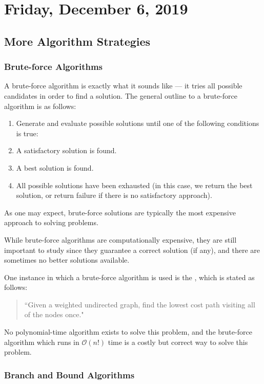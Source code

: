 \section{Friday, December 6, 2019}

\subsection{More Algorithm Strategies}

\subsubsection{Brute-force Algorithms}

A brute-force algorithm is exactly what it sounds like --- it tries all possible candidates in order to find a solution. The general outline to a brute-force algorithm is as follows:

\begin{enumerate}
    \item Generate and evaluate possible solutions until one of the following conditions is true:
    \item A satisfactory solution is found. 
    \item A best solution is found.
    \item All possible solutions have been exhausted (in this case, we return the best solution, or return failure if there is no satisfactory approach).
\end{enumerate}

As one may expect, brute-force solutions are typically the most expensive approach to solving problems. 

While brute-force algorithms are computationally expensive, they are still important to study since they guarantee a correct solution (if any), and there are sometimes no better solutions available. 

One instance in which a brute-force algorithm is used is the , which is stated as follows:
\begin{quote}
    ``Given a weighted undirected graph, find the lowest cost path visiting all of the nodes once."
\end{quote}
No polynomial-time algorithm exists to solve this problem, and the brute-force algorithm which runs in $\mathcal{O}(n!)$ time is a costly but correct way to solve this problem.  

\subsubsection{Branch and Bound Algorithms}

